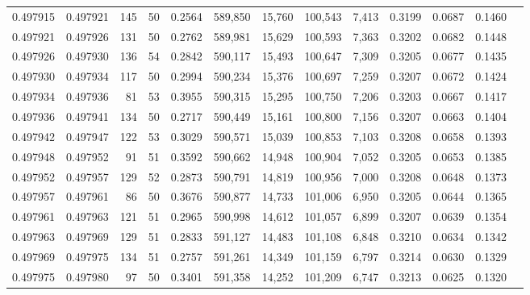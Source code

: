 \begin{tabular}{rrrrrrrrrrrrr}
0.497915 & 0.497921 &   145 &  50 &                                     0.2564 & 589,850 &  15,760 & 100,543 &   7,413 & 0.3199 & 0.0687 & 0.1460 \\
0.497921 & 0.497926 &   131 &  50 &                                     0.2762 & 589,981 &  15,629 & 100,593 &   7,363 & 0.3202 & 0.0682 & 0.1448 \\
0.497926 & 0.497930 &   136 &  54 &                                     0.2842 & 590,117 &  15,493 & 100,647 &   7,309 & 0.3205 & 0.0677 & 0.1435 \\
0.497930 & 0.497934 &   117 &  50 &                                     0.2994 & 590,234 &  15,376 & 100,697 &   7,259 & 0.3207 & 0.0672 & 0.1424 \\
0.497934 & 0.497936 &    81 &  53 &                                     0.3955 & 590,315 &  15,295 & 100,750 &   7,206 & 0.3203 & 0.0667 & 0.1417 \\
0.497936 & 0.497941 &   134 &  50 &                                     0.2717 & 590,449 &  15,161 & 100,800 &   7,156 & 0.3207 & 0.0663 & 0.1404 \\
0.497942 & 0.497947 &   122 &  53 &                                     0.3029 & 590,571 &  15,039 & 100,853 &   7,103 & 0.3208 & 0.0658 & 0.1393 \\
0.497948 & 0.497952 &    91 &  51 &                                     0.3592 & 590,662 &  14,948 & 100,904 &   7,052 & 0.3205 & 0.0653 & 0.1385 \\
0.497952 & 0.497957 &   129 &  52 &                                     0.2873 & 590,791 &  14,819 & 100,956 &   7,000 & 0.3208 & 0.0648 & 0.1373 \\
0.497957 & 0.497961 &    86 &  50 &                                     0.3676 & 590,877 &  14,733 & 101,006 &   6,950 & 0.3205 & 0.0644 & 0.1365 \\
0.497961 & 0.497963 &   121 &  51 &                                     0.2965 & 590,998 &  14,612 & 101,057 &   6,899 & 0.3207 & 0.0639 & 0.1354 \\
0.497963 & 0.497969 &   129 &  51 &                                     0.2833 & 591,127 &  14,483 & 101,108 &   6,848 & 0.3210 & 0.0634 & 0.1342 \\
0.497969 & 0.497975 &   134 &  51 &                                     0.2757 & 591,261 &  14,349 & 101,159 &   6,797 & 0.3214 & 0.0630 & 0.1329 \\
0.497975 & 0.497980 &    97 &  50 &                                     0.3401 & 591,358 &  14,252 & 101,209 &   6,747 & 0.3213 & 0.0625 & 0.1320 \\

\end{tabular}
